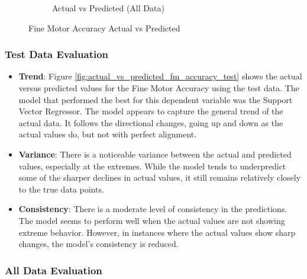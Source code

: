\begin{figure}[htbp]
\begin{subfigure}[b]{0.49\textwidth}
        \caption{Actual vs Predicted (All Data)}
        \label{fig:actual_vs_predicted_fm_accuracy_all_data}
    \end{subfigure}
    \caption{Fine Motor Accuracy Actual vs Predicted}
    \label{fig:fine_motor_accuracy_comparison}
\end{figure}

\subsubsection*{Test Data Evaluation}

\begin{itemize}
    \item \textbf{Trend}: Figure \ref{fig:actual_vs_predicted_fm_accuracy_test} shows the actual versus predicted values for the Fine Motor Accuracy using the test data. The model
          that performed the best for this dependent variable was the Support Vector Regressor. The model appears to capture the general trend of the actual data. It follows the directional
          changes, going up and down as the actual values do, but not with perfect alignment.
    \item \textbf{Variance}: There is a noticeable variance between the actual and predicted values, especially at the extremes. While the model tends to underpredict some of the sharper
          declines in actual values, it still remains relatively closely to the true data points.
    \item \textbf{Consistency}: There is a moderate level of consistency in the predictions. The model seems to perform well when the actual values are not showing extreme behavior. However,
          in instances where the actual values show sharp changes, the model's consistency is reduced.
\end{itemize}

\subsubsection*{All Data Evaluation}

